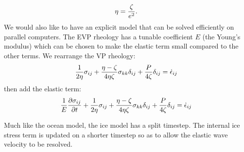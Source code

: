 \begin{equation}
      \eta = { \zeta \over e^2 }.
\end{equation}
We would also like to have an explicit model that can be solved
efficiently on parallel computers. The EVP rheology has a tunable
coefficient $E$ (the Young's modulus) which can be chosen to make
the elastic term small compared to the other terms. We rearrange the VP
rheology:
\begin{equation}
  {1 \over 2 \eta} \sigma_{ij} + {\eta - \zeta \over 4 \eta \zeta}
  \sigma_{kk} \delta_{ij} + {P \over 4 \zeta} \delta_{ij} = \dot
  \epsilon_{ij}
\end{equation}
then add the elastic term:
\begin{equation}
  {1 \over E} {\partial \sigma_{ij} \over \partial t} + {1 \over 2
  \eta} \sigma_{ij} + {\eta - \zeta \over 4 \eta \zeta} \sigma_{kk}
  \delta_{ij} + {P \over 4 \zeta} \delta_{ij} = \dot \epsilon_{ij}
\end{equation}

Much like the ocean model, the ice model has a split timestep. The
internal ice stress term is updated on a shorter timestep so as to
allow the elastic wave velocity to be resolved.


